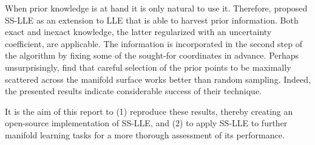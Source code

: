 When prior knowledge is at hand it is only natural to use it.
Therefore, \citet{yangetal2006} proposed SS-LLE as an extension to LLE that is
able to harvest prior information.
Both exact and inexact knowledge, the latter regularized with an uncertainty
coefficient, are applicable.
The information is incorporated in the second step of the algorithm by fixing 
some of the sought-for coordinates in advance.
Perhaps unsurprisingly, \citet{yangetal2006} find that careful selection of the
prior points to be maximally scattered across the manifold surface works better
than random sampling.
Indeed, the presented results indicate considerable success of their technique.

It is the aim of this report to (1) reproduce these results, thereby creating
an open-source implementation of SS-LLE, and (2) to apply SS-LLE to further 
manifold learning tasks for a more thorough assessment of its performance.
